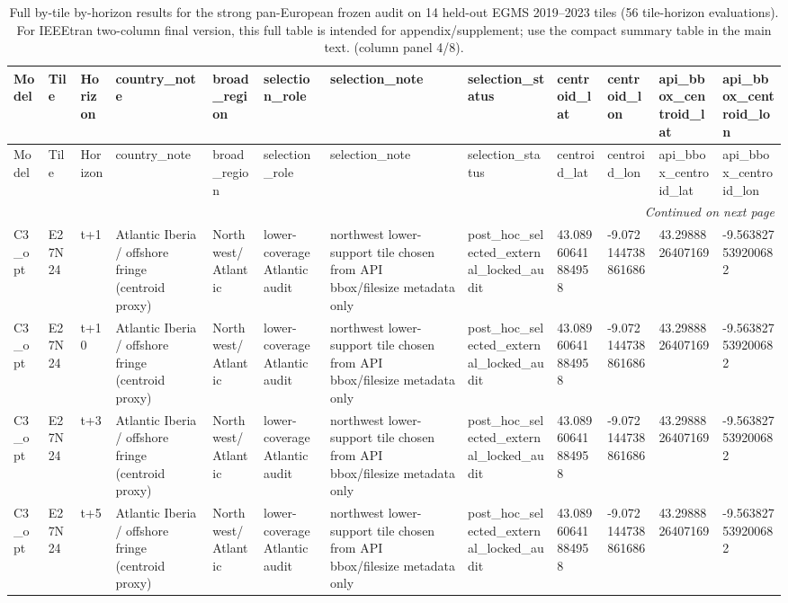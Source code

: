 \begin{landscape}
\scriptsize
\setlength{\LTleft}{0pt}
\setlength{\LTright}{0pt}
\begin{longtable}{llllllllllll}
\caption{Full by-tile by-horizon results for the strong pan-European frozen audit on 14 held-out EGMS 2019--2023 tiles (56 tile-horizon evaluations). For IEEEtran two-column final version, this full table is intended for appendix/supplement; use the compact summary table in the main text. (column panel 4/8).}\label{tab:e7_strong_by_tile_full_part4}\\
\toprule
Model & Tile & Horizon & country\_note & broad\_region & selection\_role & selection\_note & selection\_status & centroid\_lat & centroid\_lon & api\_bbox\_centroid\_lat & api\_bbox\_centroid\_lon \\
\midrule
\endfirsthead
\toprule
Model & Tile & Horizon & country\_note & broad\_region & selection\_role & selection\_note & selection\_status & centroid\_lat & centroid\_lon & api\_bbox\_centroid\_lat & api\_bbox\_centroid\_lon \\
\midrule
\endhead
\midrule
\multicolumn{12}{r}{\textit{Continued on next page}} \\
\endfoot
\bottomrule
\endlastfoot
C3\_opt & E27N24 & t+1 & Atlantic Iberia / offshore fringe (centroid proxy) & Northwest/Atlantic & lower-coverage Atlantic audit & northwest lower-support tile chosen from API bbox/filesize metadata only & post\_hoc\_selected\_external\_locked\_audit & 43.08960641884958 & -9.072144738861686 & 43.2988826407169 & -9.563827539200682 \\
C3\_opt & E27N24 & t+10 & Atlantic Iberia / offshore fringe (centroid proxy) & Northwest/Atlantic & lower-coverage Atlantic audit & northwest lower-support tile chosen from API bbox/filesize metadata only & post\_hoc\_selected\_external\_locked\_audit & 43.08960641884958 & -9.072144738861686 & 43.2988826407169 & -9.563827539200682 \\
C3\_opt & E27N24 & t+3 & Atlantic Iberia / offshore fringe (centroid proxy) & Northwest/Atlantic & lower-coverage Atlantic audit & northwest lower-support tile chosen from API bbox/filesize metadata only & post\_hoc\_selected\_external\_locked\_audit & 43.08960641884958 & -9.072144738861686 & 43.2988826407169 & -9.563827539200682 \\
C3\_opt & E27N24 & t+5 & Atlantic Iberia / offshore fringe (centroid proxy) & Northwest/Atlantic & lower-coverage Atlantic audit & northwest lower-support tile chosen from API bbox/filesize metadata only & post\_hoc\_selected\_external\_locked\_audit & 43.08960641884958 & -9.072144738861686 & 43.2988826407169 & -9.563827539200682 \\

\end{longtable}
\end{landscape}
